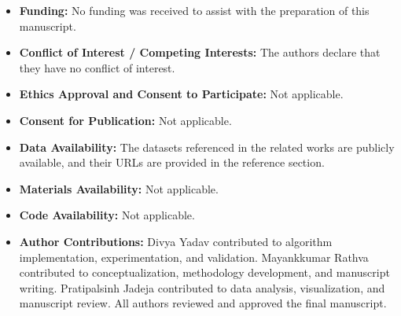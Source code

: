 \documentclass[preprint,nopreprintline]{elsarticle}
\theoremstyle{plain}
\theoremstyle{definition}
\begin{document}
\begin{itemize}
\item \textbf{Funding:} No funding was received to assist with the preparation of this manuscript.
\item \textbf{Conflict of Interest / Competing Interests:} The authors declare that they have no conflict of interest.
\item \textbf{Ethics Approval and Consent to Participate:} Not applicable.
\item \textbf{Consent for Publication:} Not applicable.
\item \textbf{Data Availability:} The datasets referenced in the related works are publicly available, and their URLs are provided in the reference section.
\item \textbf{Materials Availability:} Not applicable.
\item \textbf{Code Availability:} Not applicable.
\item \textbf{Author Contributions:} Divya Yadav contributed to algorithm implementation, experimentation, and validation. Mayankkumar Rathva contributed to conceptualization, methodology development, and manuscript writing. Pratipalsinh Jadeja contributed to data analysis, visualization, and manuscript review. All authors reviewed and approved the final manuscript.
\end{itemize}



\end{document}

